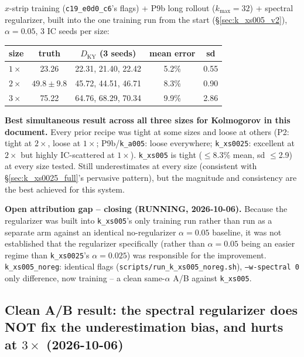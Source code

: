 \documentclass[11pt]{article}
\begin{document}
$x$-strip training (\texttt{c19\_e0d0\_c6}'s flags) + P9b long rollout
($k_{\max}{=}32$) + spectral regularizer, built into the one training
run from the start (\S\ref{sec:k_xs005_v2}), $\alpha{=}0.05$, 3 IC
seeds per size:
\begin{center}
\small
\begin{tabular}{lcccc}
\toprule
size & truth & $D_{\mathrm{KY}}$ (3 seeds) & mean error & sd \\
\midrule
$1\times$ & 23.26 & 22.31, 21.40, 22.42 & 5.2\% & 0.55 \\
$2\times$ & $49.8\pm9.8$ & 45.72, 44.51, 46.71 & 8.3\% & 0.90 \\
$3\times$ & 75.22 & 64.76, 68.29, 70.34 & 9.9\% & 2.86 \\
\bottomrule
\end{tabular}
\end{center}
\textbf{Best simultaneous result across all three sizes for Kolmogorov
in this document.} Every prior recipe was tight at some sizes and loose
at others (P2: tight at $2\times$, loose at $1\times$; P9b/\texttt{k\_a005}:
loose everywhere; \texttt{k\_xs0025}: excellent at $2\times$ but highly
IC-scattered at $1\times$). \texttt{k\_xs005} is tight ($\le$8.3\%
mean, sd $\le$2.9) at every size tested. Still underestimates at every
size (consistent with \S\ref{sec:k_xs0025_full}'s pervasive pattern),
but the magnitude and consistency are the best achieved for this system.

\textbf{Open attribution gap -- closing (RUNNING, 2026-10-06).}
Because the regularizer was built into \texttt{k\_xs005}'s only
training run rather than run as a separate arm against an identical
no-regularizer $\alpha{=}0.05$ baseline, it was not established that the
regularizer specifically (rather than $\alpha{=}0.05$ being an easier
regime than \texttt{k\_xs0025}'s $\alpha{=}0.025$) was responsible for
the improvement. \texttt{k\_xs005\_noreg}: identical flags
(\texttt{scripts/run\_k\_xs005\_noreg.sh}), \texttt{--w-spectral 0}
only difference, now training -- a clean same-$\alpha$ A/B against
\texttt{k\_xs005}.

\subsection{Clean A/B result: the spectral regularizer does NOT fix the
underestimation bias, and hurts at $3\times$ (2026-10-06)}
\label{sec:k_xs005_ab_results}
\end{document}
